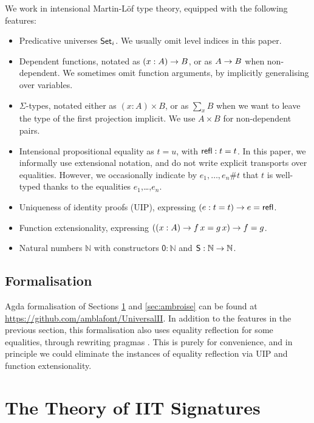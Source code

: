 \documentclass[a4paper,UKenglish,cleveref, autoref]{lipics-v2019}
\begin{document}
We work in intensional Martin-Löf type theory, equipped with the following features:
\begin{itemize}
  \item Predicative universes $\mathsf{Set}_i$. We usually omit level indices in this paper.
  \item Dependent functions, notated as $(x : A)\rightarrow B$, or as $A \rightarrow B$ when
    non-dependent. We sometimes omit function arguments, by implicitly
    generalising over variables.
  \item $\Sigma$-types, notated either as $(x : A)\times B$, or as $\sum\limits_{x} B$
        when we want to leave the type of the first projection implicit. We use $A
        \times B$ for non-dependent pairs.
  \item Intensional propositional equality as $t = u$, with $\mathsf{refl} : t = t$. In
    this paper, we informally use extensional notation, and do not write
    explicit transports over equalities. However, we occasionally indicate by
    $e_1,\dots,e_n \#t$ that $t$ is well-typed thanks to the equalities
    $e_1$,\dots,$e_n$.
  \item Uniqueness of identity proofs (UIP), expressing $(e : t = t)\rightarrow e = \mathsf{refl}$.
  \item Function extensionality, expressing $((x : A) \rightarrow f\,x = g\,x) \rightarrow f = g$.
  \item Natural numbers $\mathbb{N}$ with constructors $\mathsf{0}:\mathbb{N}$ and $\mathsf{S}:\mathbb{N}\rightarrow\mathbb{N}$.

\end{itemize}

\subsection{Formalisation}

Agda formalisation of Sections \ref{sec:theory_of_signatures} and
\ref{sec:ambroise} can be found at
\url{https://github.com/amblafont/UniversalII}. In addition to the features in
the previous section, this formalisation also uses equality reflection for some
equalities, through rewriting pragmas \cite{cockxsprinkles}. This is purely for
convenience, and in principle we could eliminate the instances of equality
reflection via UIP and function extensionality.

\section{The Theory of IIT Signatures}
\label{sec:theory_of_signatures}
\end{document}
